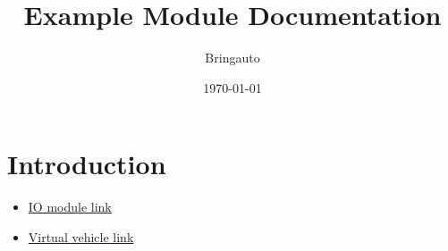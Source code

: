 \documentclass{article}
\title{Example Module Documentation}
\author{Bringauto}
\date{\today}
\begin{document}
\maketitle %

\section{Introduction}

\begin{itemize}
    \item \href{\getref{io_module}}{IO module link}
    \item \href{\getref{virtual_vehicle}}{Virtual vehicle link}
\end{itemize}
\end{document}
